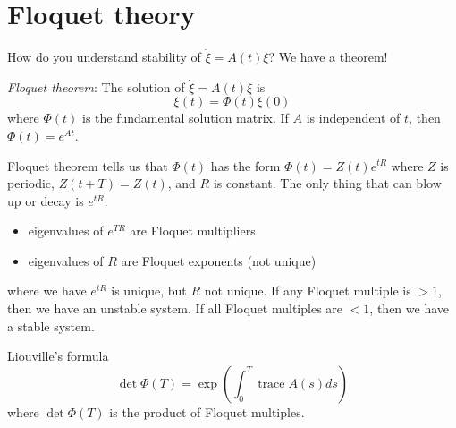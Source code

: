 \documentclass{article}
\begin{document}
\section{Floquet theory}
How do you understand stability of $\dot{\xi}=A(t)\xi$? We have a theorem!

\textit{Floquet theorem}: The solution of $\dot{\xi}=A(t)\xi$ is 
\[\xi(t)=\Phi(t)\xi(0)\]
where $\Phi(t)$ is the fundamental solution matrix. If $A$ is independent of $t$, then $\Phi(t)=e^{At}$.

Floquet theorem tells us that $\Phi(t)$ has the form $\Phi(t)=Z(t)e^{tR}$ where $Z$ is periodic, $Z(t+T)=Z(t)$, and $R$ is constant. The only thing that can blow up or decay is $e^{tR}$.
\begin{itemize}
    \item eigenvalues of $e^{TR}$ are Floquet multipliers
    \item eigenvalues of $R$ are Floquet exponents (not unique)
\end{itemize}
where we have $e^{tR}$ is unique, but $R$ not unique. If any Floquet multiple is $>1$, then we have an unstable system. If all Floquet multiples are $<1$, then we have a stable system.

Liouville's formula
\[\det \Phi(T)=\exp\left(\int_{0}^{T}\operatorname{trace}A(s)ds\right) \]
where $\det \Phi(T)$ is the product of Floquet multiples.
\end{document}
